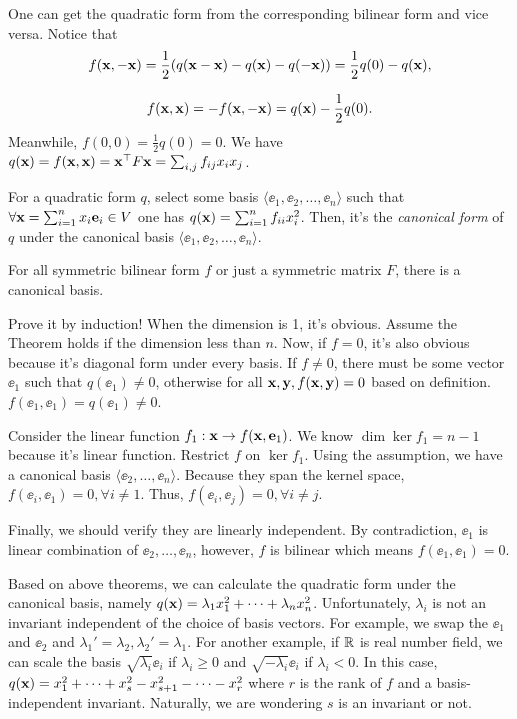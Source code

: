 \documentclass[12pt]{article}
\begin{document}
One can get the quadratic form from the
corresponding bilinear form and vice versa.
Notice that
$$
f(\mathbf{x}, -\mathbf{x}) =
\frac{1}{2}(q(\mathbf{x} - \mathbf{x}) - q(\mathbf{x}) - q(-\mathbf{x}))
= \frac{1}{2}q(0) - q(\mathbf{x}),
$$

$$
f(\mathbf{x}, \mathbf{x}) = -f(\mathbf{x}, -\mathbf{x})
= q(\mathbf{x}) - \frac{1}{2}q(0).
$$
Meanwhile, $f(0,0) = \frac{1}{2}q(0) = 0$.
We have $q(\mathbf{x}) = f(\mathbf{x}, \mathbf{x}) =
\mathbf{x}^\top F \mathbf{x} = \sum_{i,j}f_{ij}x_ix_j$.

\begin{Define}
  For a quadratic form $q$, select some basis
  $\langle \ee_1, \ee_2, \dots, \ee_n \rangle$
  such that $\forall \mathbf{x} =
  \sum_{i=1}^n x_i\mathbf{e}_i \in V$ one has
  $q(\mathbf{x}) = \sum_{i=1}^n f_{ii}x_i^2$. Then,
  it's the \emph{canonical form} of $q$ under
  the canonical basis $\langle \ee_1, \ee_2,
  \dots, \ee_n \rangle$.
\end{Define}

\begin{Theorem}
  For all symmetric bilinear form $f$ or just
  a symmetric matrix $F$, there is a canonical
  basis.
\end{Theorem}

\begin{Proof}
  Prove it by induction! When the dimension is
  1, it's obvious. Assume the Theorem holds
  if the dimension less than $n$. Now,
  if $f = 0$, it's also obvious because it's
  diagonal form under every basis. If
  $f \neq 0$, there must be some vector $\ee_1$
  such that $q(\ee_1) \neq 0$, otherwise for
  all $\mathbf{x}, \mathbf{y}, f(\mathbf{x}, \mathbf{y}) = 0$ based on
  definition. $f(\ee_1, \ee_1) = q(\ee_1)
  \neq 0$.

  Consider the linear function $f_1: \mathbf{x}
  \rightarrow f(\mathbf{x}, \mathbf{e}_1)$. We know
  $\dim \ker f_1 = n - 1$ because it's linear
  function. Restrict $f$ on $\ker f_1$. Using
  the assumption, we have a canonical basis
  $\langle \ee_2, \dots, \ee_n \rangle$.
  Because they span the kernel space,
  $f(\ee_i , \ee_1) = 0, \forall i \neq 1$.
  Thus, $f(\ee_i, \ee_j) = 0, \forall i\neq j$.
  
  Finally, we should verify they are linearly
  independent. By contradiction, $\ee_1$ is
  linear combination of $\ee_2, \dots, \ee_n$,
  however, $f$ is bilinear which means
  $f(\ee_1, \ee_1) = 0$.
\end{Proof}

Based on above theorems, we can calculate the
quadratic form under the canonical basis,
namely $q(\mathbf{x}) = \lambda_1 x_1^2 + \dots +
\lambda_n x_n^2$. Unfortunately, $\lambda_i$ is
not an invariant independent of the choice of
basis vectors. For example, we swap the $\ee_1$
and $\ee_2$ and $\lambda_1' = \lambda_2,
\lambda_2' = \lambda_1$. For another example,
if $\mathbb{R}$ is real number field, we can scale the basis $\sqrt{\lambda_i}\ee_i$
if $\lambda_i \geq 0$ and $\sqrt{-\lambda_i}
\ee_i$ if $\lambda_i < 0$. In this case,
$q(\mathbf{x}) = x_1^2 + \dots + x_s^2 - x_{s+1}^2 - \dots -
x_{r}^2$ where $r$ is the rank of $f$ and a
basis-independent invariant. Naturally, we are
wondering $s$ is an invariant or not.
\end{document}
